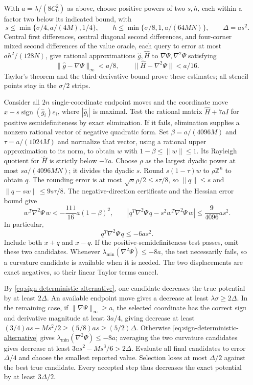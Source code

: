 With $a=\lambda/(8C_0^2)$ as above, choose positive powers of two $s,h$, each within
a factor two below its indicated bound, with
\[
 s\le\min\{\sigma/4,a/(4M),1/4\},\qquad
 h\le\min\{\sigma/8,1,a/(64MN)\},\qquad
 \Delta=as^2.
\]
Central first differences, central diagonal second differences, and
four-corner mixed second differences of the value oracle, each query
to error at most $ah^2/(128N)$, give rational approximations
$\widehat g,\widehat H$ to $\nabla\Psi,\nabla^2\Psi$ satisfying
\[
 \|\widehat g-\nabla\Psi\|_\infty<a/8,
 \qquad\|\widehat H-\nabla^2\Psi\|<a/16.
\]
Taylor's theorem and the third-derivative bound prove these estimates;
all stencil points stay in the $\sigma/2$ strips.

Consider all $2n$ single-coordinate endpoint moves and the coordinate
move $x-s\operatorname{sign}(\widehat g_i)e_i$, where
$|\widehat g_i|$ is maximal.  Test the rational matrix
$\widehat H+7aI$ for positive semidefiniteness by exact elimination.
If it fails, elimination supplies a nonzero rational vector of
negative quadratic form.  Set $\beta=a/(4096M)$ and
$\tau=a/(1024M)$ and normalize that vector, using a rational upper
approximation to its norm, to obtain $w$ with
$1-\beta\le\|w\|\le1$.  Its Rayleigh quotient for
$\widehat H$ is strictly below $-7a$.
Choose $\rho$ as the largest dyadic power at most
$sa/(4096MN)$; it divides the dyadic $s$.
Round $s(1-\tau)w$ to $\rho\mathbb Z^n$ to obtain $q$.
The rounding error is at most $\sqrt n\rho/2\le s\tau/8$, so
$\|q\|\le s$ and $\|q-sw\|\le9s\tau/8$.
The negative-direction certificate and the Hessian error bound give
\[
 w^T\nabla^2\Psi\,w<-\frac{111}{16}a(1-\beta)^2,
 \qquad
 |q^T\nabla^2\Psi\,q-s^2w^T\nabla^2\Psi\,w|
 \le\frac9{4096}as^2.
\]
In particular,
\[
 q^T\nabla^2\Psi\,q\le-6as^2.
\]
Include both $x+q$ and $x-q$.  If the positive-semidefiniteness test
passes, omit these two candidates.  Whenever
$\lambda_{\min}(\nabla^2\Psi)\le-8a$, the test necessarily fails,
so a curvature candidate is available when it is needed.
The two displacements are exact negatives, so
their linear Taylor terms cancel.

By \eqref{eq:sign-deterministic-alternative}, one candidate decreases
the true potential by at least $2\Delta$.
An available endpoint move gives a decrease at least
$\lambda\sigma\ge2\Delta$. In the remaining case, if
$\|\nabla\Psi\|_\infty\ge a$, the selected coordinate has the
correct sign and derivative magnitude at least $3a/4$, giving decrease
at least $(3/4)as-Ms^2/2\ge(5/8)as\ge(5/2)\Delta$.
Otherwise \eqref{eq:sign-deterministic-alternative} gives
$\lambda_{\min}(\nabla^2\Psi)\le-8a$; averaging the two curvature
candidates gives decrease at least
$3as^2-Ms^3/6>2\Delta$.
Evaluate all final candidates to error $\Delta/4$ and choose the
smallest reported value.  Selection loses at most $\Delta/2$ against
the best true candidate.  Every accepted step thus decreases the
exact potential by at least $3\Delta/2$.

